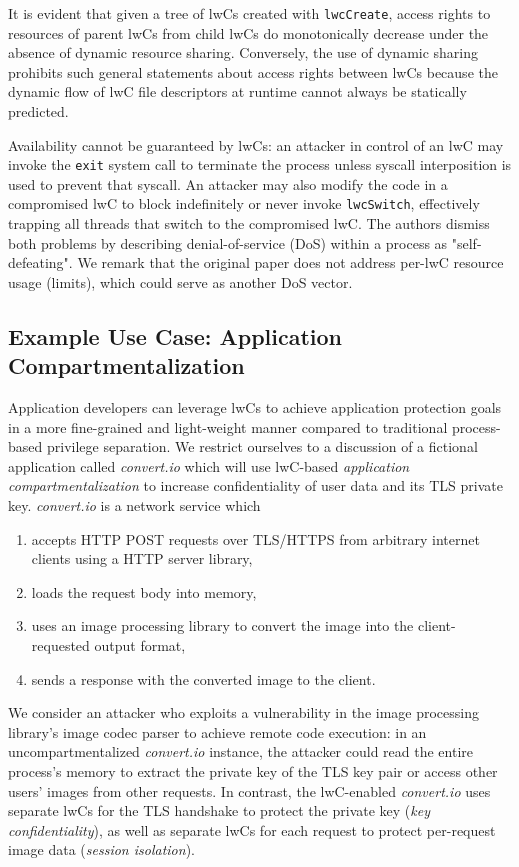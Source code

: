 \documentclass[10pt,twocolumn,letter]{article}
\begin{document}
It is evident that given a tree of lwCs created with \lstinline{lwcCreate}, access rights to resources of parent lwCs from child lwCs do monotonically decrease under the absence of dynamic resource sharing.
Conversely, the use of dynamic sharing prohibits such general statements about access rights between lwCs because the dynamic flow of lwC file descriptors at runtime cannot always be statically predicted.

Availability cannot be guaranteed by lwCs:
an attacker in control of an lwC may invoke the \lstinline{exit} system call to terminate the process unless syscall interposition is used to prevent that syscall.
An attacker may also modify the code in a compromised lwC to block indefinitely or never invoke \lstinline{lwcSwitch}, effectively trapping all threads that switch to the compromised lwC.
The authors dismiss both problems by describing denial-of-service (DoS) within a process as "self-defeating".
We remark that the original paper does not address per-lwC resource usage (limits), which could serve as another DoS vector. 


\subsection{Example Use Case: Application Compartmentalization}\label{design:usage}

Application developers can leverage lwCs to achieve application protection goals in a more fine-grained and light-weight manner compared to traditional process-based privilege separation.
We restrict ourselves to a discussion of a fictional application called \newcommand\appname{\textit{convert.io}\xspace} \appname which will use lwC-based \textit{application compartmentalization} to increase confidentiality of user data and its TLS private key. 
\appname is a network service which
\begin{enumerate}
  \item accepts HTTP POST requests over TLS/HTTPS from arbitrary internet clients using a HTTP server library,
  \item loads the request body into memory,
  \item uses an image processing library to convert the image into the client-requested output format,
  \item sends a response with the converted image to the client.
\end{enumerate}

We consider an attacker who exploits a vulnerability in the image processing library's image codec parser to achieve remote code execution:
in an uncompartmentalized \appname instance, the attacker could read the entire process's memory to extract the private key of the TLS key pair or access other users' images from other requests.
In contrast, the lwC-enabled \appname uses separate lwCs for the TLS handshake to protect the private key (\textit{key confidentiality}), as well as separate lwCs for each request to protect per-request image data (\textit{session isolation}).
\end{document}
